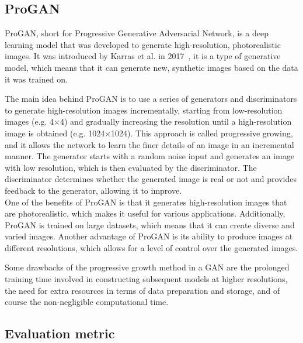 \subsection{ProGAN}
\label{sec:proGAN}
ProGAN, short for Progressive Generative Adversarial Network, is a deep learning model that was developed to generate high-resolution, photorealistic images. It was introduced by Karras et al. in 2017~\cite{ProGAN}, it is a type of generative model, which means that it can generate new, synthetic images based on the data it was trained on.

\noindent The main idea behind ProGAN is to use a series of generators and discriminators to generate high-resolution images incrementally, starting from low-resolution images (e.g. 4×4) and gradually increasing the resolution until a high-resolution image is obtained (e.g. 1024×1024). This approach is called progressive growing, and it allows the network to learn the finer details of an image in an incremental manner. The generator starts with a random noise input and generates an image with low resolution, which is then evaluated by the discriminator. The discriminator determines whether the generated image is real or not and provides feedback to the generator, allowing it to improve. \\

\noindent One of the benefits of ProGAN is that it generates high-resolution images that are photorealistic, which makes it useful for various applications. Additionally, ProGAN is trained on large datasets, which means that it can create diverse and varied images.
Another advantage of ProGAN is its ability to produce images at different resolutions, which allows for a level of control over the generated images.

\noindent Some drawbacks of the progressive growth method in a GAN are the prolonged training time involved in constructing subsequent models at higher resolutions, the need for extra resources in terms of data preparation and storage, and of course the non-negligible computational time.
%
%
%
\subsection{Evaluation metric}
